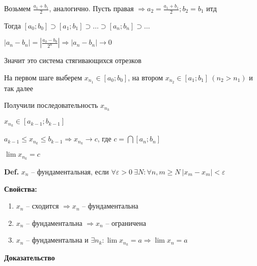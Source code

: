 \documentclass[14pt, letter paper]{article}
\begin{document}
Возьмем $\frac{a_1 + b_1}{2}$, аналогично. Пусть правая $\Rightarrow a_2 = \frac{a_1 + b_1}{2}; b_2 = b_1$ итд

Тогда $[a_0;b_0] \supset [a_1;b_1] \supset \ldots \supset [a_n;b_n] \supset \ldots$

$|a_n - b_n| = |\frac{a_0 - b_0}{2^n}| \Rightarrow |a_n - b_n| \rightarrow 0$

Значит это система стягивающихся отрезков

На первом шаге выберем $x_{n_1} \in [a_0;b_0]$, на втором $x_{n_2} \in [a_1;b_1]\ (n_2 > n_1)$ и так далее

Получили последовательность $x_{n_k}$

$x_{n_k} \in [a_{k-1};b_{k-1}]$

$a_{k-1} \leq x_{n_k} \leq b_{k-1} \Rightarrow x_{n_k} \rightarrow c$, где $c = \bigcap [a_n;b_n]$

$\lim{x_{n_k}} = c$

\textbf{Def.} $x_n$ -- фундаментальная, если $\forall \varepsilon > 0\ \exists N : \forall n, m \geq N\ |x_m - x_m| < \varepsilon$

\textbf{Свойства:}

\begin{enumerate}
    \item $x_n$ -- сходится $\Rightarrow x_n$ -- фундаментальна
    \item $x_n$ -- фундаментальна $\Rightarrow x_n$ -- ограничена
    \item $x_n$ -- фундаментальна и $\exists n_k : \lim{x_{n_k}} = a \Rightarrow \lim{x_n} = a$
\end{enumerate}

\begin{center}
    \textbf{Доказательство}
\end{center}
\end{document}
